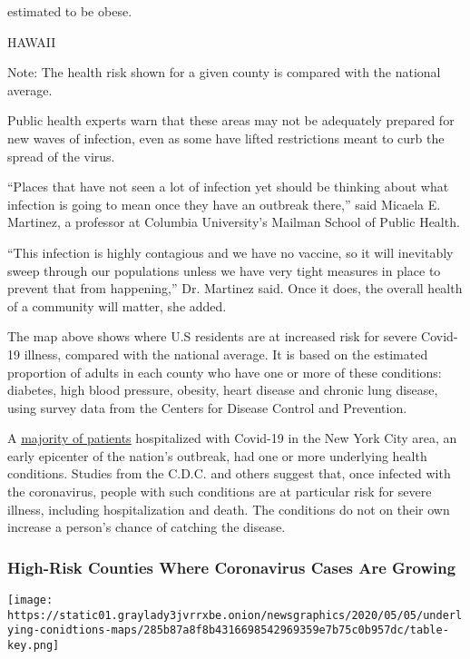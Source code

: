 estimated to be obese.

HAWAII

Note: The health risk shown for a given county is compared with the
national average.

Public health experts warn that these areas may not be adequately
prepared for new waves of infection, even as some have lifted
restrictions meant to curb the spread of the virus.

``Places that have not seen a lot of infection yet should be thinking
about what infection is going to mean once they have an outbreak
there,'' said Micaela E. Martinez, a professor at Columbia University's
Mailman School of Public Health.

``This infection is highly contagious and we have no vaccine, so it will
inevitably sweep through our populations unless we have very tight
measures in place to prevent that from happening,'' Dr. Martinez said.
Once it does, the overall health of a community will matter, she added.

The map above shows where U.S residents are at increased risk for severe
Covid-19 illness, compared with the national average. It is based on the
estimated proportion of adults in each county who have one or more of
these conditions: diabetes, high blood pressure, obesity, heart disease
and chronic lung disease, using survey data from the Centers for Disease
Control and Prevention.

A
\href{https://www.nytimes3xbfgragh.onion/2020/04/23/health/coronavirus-patients-risk.html}{majority
of patients} hospitalized with Covid-19 in the New York City area, an
early epicenter of the nation's outbreak, had one or more underlying
health conditions. Studies from the C.D.C. and others suggest that, once
infected with the coronavirus, people with such conditions are at
particular risk for severe illness, including hospitalization and death.
The conditions do not on their own increase a person's chance of
catching the disease.

\hypertarget{high-risk-counties-where-coronavirus-cases-are-growing}{%
\subsubsection{High-Risk Counties Where Coronavirus Cases Are
Growing}\label{high-risk-counties-where-coronavirus-cases-are-growing}}

\texttt{[image: https://static01.graylady3jvrrxbe.onion/newsgraphics/2020/05/05/underlying-conidtions-maps/285b87a8f8b4316698542969359e7b75c0b957dc/table-key.png]}

